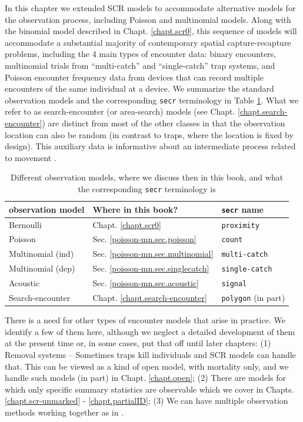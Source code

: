 In this chapter we extended SCR models to accommodate alternative
models for the observation process, including Poisson and multinomial
models.  Along with the binomial model described in
Chapt. \ref{chapt.scr0}, this sequence of models will accommodate a
substantial majority of contemporary spatial capture-recapture
problems, including the 4 main types of encounter data: binary
encounters, multinomial trials from ``multi-catch'' and
``single-catch'' \citep{efford:2004, efford:2011, royle_gardner:2011}
trap systems, and Poisson encounter frequency data from devices that
can record multiple encounters of the same individual at a device.  We
summarize the standard observation models and the corresponding
\mbox{\tt secr} terminology in Table \ref{poisson-mn.tab.models}.
What we refer to as search-encounter (or area-search) models (see
Chapt. \ref{chapt.search-encounter}) are distinct from most of the
other classes in that the observation location can also be random (in
contrast to traps, where the location is fixed by design). This
auxiliary data is informative about an intermediate process related to
movement \citep{royle_young:2008}.

\begin{table}[ht]
\centering
\caption{
Different observation models, where we discuss then in this
  book, and what the corresponding \mbox{\tt secr} terminology is
}
\begin{tabular}{lll}
\hline \hline
observation model & Where in this book?  &  \mbox{\tt secr} name  \\ \hline
Bernoulli         & Chapt. \ref{chapt.scr0}    &   \mbox{\tt proximity} \\
Poisson           & Sec. \ref{poisson-mn.sec.poisson} & \mbox{\tt count} \\
Multinomial (ind) & Sec. \ref{poisson-mn.sec.multinomial} & \mbox{\tt  multi-catch} \\
Multinomial (dep) & Sec. \ref{poisson-mn.sec.singlecatch} & \mbox{\tt  single-catch} \\
Acoustic          & Sec. \ref{poisson-mn.sec.acoustic}
   &  \mbox{\tt signal}  \\
Search-encounter      & Chapt. \ref{chapt.search-encounter}  &
\mbox{\tt polygon} (in part) \\ \hline
\end{tabular}
\label{poisson-mn.tab.models}
\end{table}

There is a need for other types of encounter models that arise in
practice. We identify a few of them here, although we neglect a
detailed development of them at the present time or, in some cases,
put that off until later chapters: (1) Removal systems -- Sometimes
traps kill individuals and SCR models can handle that. This can be
viewed as a kind of open model, with mortality only, and we handle
such models (in part) in Chapt. \ref{chapt.open}; (2) There are models
for which only specific summary statistics are observable
\citep{chandler_royle:2012,sollmann_etal:2012ecol} which we cover in
Chapts. \ref{chapt.scr-unmarked} - \ref{chapt.partialID}; (3) We can
have multiple observation methods working together as in
\citet{gopalaswamy_etal:2012ecol}.

